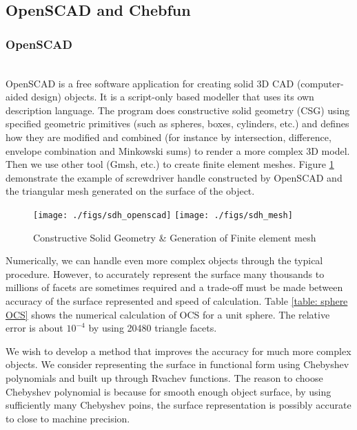 \documentclass[11pt,reqno]{amsart}
\theoremstyle{definition}
\begin{document}
\subsection{OpenSCAD and Chebfun}
\subsubsection{OpenSCAD}~\\
OpenSCAD is a free software application for creating solid 3D CAD (computer-aided design) objects. It is a script-only based modeller that uses its own description language. The program does constructive solid geometry (CSG) using specified geometric primitives (such as spheres, boxes, cylinders, etc.) and defines how they are modified and combined (for instance by intersection, difference, envelope combination and Minkowski sums) to render a more complex 3D model. Then we use other tool (Gmsh, etc.) to create finite element meshes. Figure \ref{fig:sdh_openscad} demonstrate the example of screwdriver handle constructed by OpenSCAD and the triangular mesh generated on the surface of the object.
\begin{figure}[H]   	
\centerline{\texttt{[image: ./figs/sdh\_openscad]}
     	\hspace{-6pt}
		\texttt{[image: ./figs/sdh\_mesh]}}
     	\hspace{-6pt}
		\caption{Constructive Solid Geometry \& Generation of Finite element 
                mesh~\cite{mesh}}
        \label{fig:sdh_openscad}
\end{figure}

Numerically, we can handle even more complex objects through the typical procedure. However, to accurately represent the surface many thousands to millions of facets are sometimes required and a trade-off must be made between accuracy of the surface represented and speed of calculation. Table \ref{table: sphere OCS} shows the numerical calculation of OCS for a unit sphere. The relative error is about $10^{-4}$ by using 20480 triangle facets.  

We wish to develop a method that improves the accuracy for much more complex objects. We consider representing the surface in functional form using Chebyshev polynomials and built up through Rvachev functions. The reason to choose Chebyshev polynomial is because for smooth enough object surface, by using sufficiently many Chebyshev poins, the surface representation is possibly accurate to close to machine precision.
\end{document}
